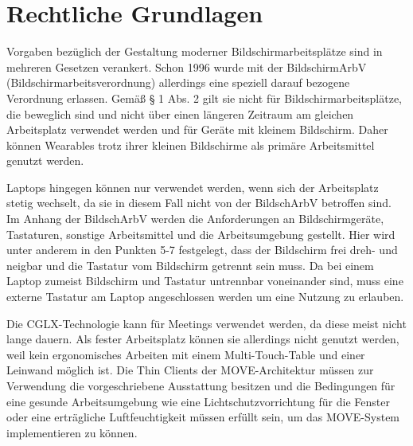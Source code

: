 \newpage
\section{Rechtliche Grundlagen}
Vorgaben bezüglich der Gestaltung moderner Bildschirmarbeitsplätze sind in mehreren Gesetzen verankert. Schon 1996 wurde mit der BildschirmArbV (Bildschirmarbeitsverordnung) allerdings eine speziell darauf bezogene Verordnung erlassen. Gemäß § 1 Abs. 2 gilt sie nicht für Bildschirmarbeitsplätze, die beweglich sind und nicht über einen längeren Zeitraum am gleichen Arbeitsplatz verwendet werden und für Geräte mit kleinem Bildschirm. Daher können Wearables trotz ihrer kleinen Bildschirme als primäre Arbeitsmittel genutzt werden.

Laptops hingegen können nur verwendet werden, wenn sich der Arbeitsplatz stetig wechselt, da sie in diesem Fall nicht von der BildschArbV betroffen sind. Im Anhang der BildschArbV werden die Anforderungen an Bildschirmgeräte, Tastaturen, sonstige Arbeitsmittel und die Arbeitsumgebung gestellt. Hier wird unter anderem in den Punkten 5-7 festgelegt, dass der Bildschirm frei dreh- und neigbar und die Tastatur vom Bildschirm getrennt sein muss. Da bei einem Laptop zumeist Bildschirm und Tastatur untrennbar voneinander sind, muss eine externe Tastatur am Laptop angeschlossen werden um eine Nutzung zu erlauben.

Die CGLX-Technologie kann für Meetings verwendet werden, da diese meist nicht lange dauern. Als fester Arbeitsplatz können sie allerdings nicht genutzt werden, weil kein ergonomisches Arbeiten mit einem Multi-Touch-Table und einer Leinwand möglich ist. Die Thin Clients der MOVE-Architektur müssen zur Verwendung die vorgeschriebene Ausstattung besitzen und die Bedingungen für eine gesunde Arbeitsumgebung wie eine Lichtschutzvorrichtung für die Fenster oder eine erträgliche Luftfeuchtigkeit müssen erfüllt sein, um das MOVE-System implementieren zu können.\nocite{BildschArbV}